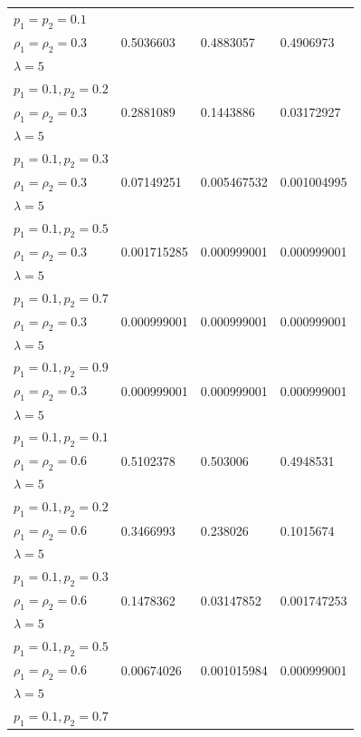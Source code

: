 \documentclass[12pt,oneside]{report}
\theoremstyle{definition}
\theoremstyle{mystyle}
\begin{document}
\begin{landscape}
\begin{center}
\begin{longtable}[h!]{|l|l|l| l|}
			$ p_{1}=p_{2}=0.1 $ &  & &  \\
			$ \rho_{1}=\rho_{2}=0.3 $ &0.5036603 & 0.4883057 &0.4906973 \\
			$\lambda=5$ &  &  &\\ \hline
			$ p_{1}=0.1,p_{2}=0.2 $  &  &  &\\
			$ \rho_{1}=\rho_{2}=0.3 $  &0.2881089  &0.1443886 &0.03172927 \\
			$\lambda=5$ &  &  &\\ \hline
			$ p_{1}=0.1,p_{2}=0.3 $ & & & \\
			$ \rho_{1}=\rho_{2}=0.3 $  &0.07149251 &0.005467532 &0.001004995 \\
			$\lambda=5$ &  & & \\ \hline
			$ p_{1}=0.1,p_{2}=0.5 $ &&&\\
			$ \rho_{1}=\rho_{2}=0.3 $&0.001715285&0.000999001&0.000999001\\
			$\lambda=5$ &  & & \\ \hline
			$ p_{1}=0.1,p_{2}=0.7 $ &&&\\
			$ \rho_{1}=\rho_{2}=0.3 $ &0.000999001  & 0.000999001 &0.000999001\\
			$\lambda=5$ &  &  &\\ \hline
			$ p_{1}=0.1,p_{2}=0.9$ &  &  &\\
			$ \rho_{1}=\rho_{2}=0.3 $  & 0.000999001  & 0.000999001 & 0.000999001\\
			$\lambda=5$ &  &  &\\ \hline
			$ p_{1}=0.1,p_{2}=0.1$ &  & & \\
			$ \rho_{1}=\rho_{2}=0.6 $  &0.5102378  &0.503006 & 0.4948531\\
			$\lambda=5$ &  &  &\\ \hline
			$ p_{1}=0.1,p_{2}=0.2$ &  &  & \\ 
			$ \rho_{1}=\rho_{2}=0.6 $  & 0.3466993 &0.238026 &0.1015674 \\
			$\lambda=5$ &  &  &\\ \hline
			$ p_{1}=0.1,p_{2}=0.3$&  & & \\
			$ \rho_{1}=\rho_{2}=0.6 $  &0.1478362  &0.03147852 &0.001747253 \\
			$\lambda=5$ &  &  &\\ \hline
			$ p_{1}=0.1,p_{2}=0.5$ &  & & \\
			$ \rho_{1}=\rho_{2}=0.6 $  &0.00674026  &0.001015984 & 0.000999001 \\
			$\lambda=5$ &  & & \\ \hline
			$ p_{1}=0.1,p_{2}=0.7$ &  & & \\

\end{longtable}
\end{center}
\end{landscape}
\end{document}
